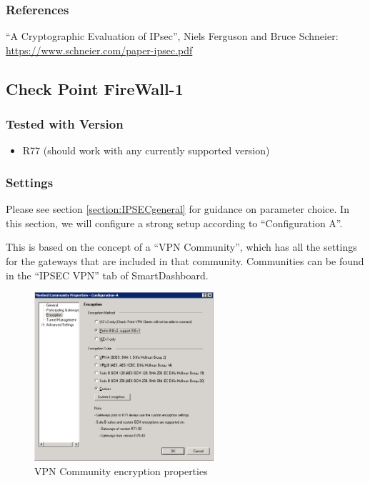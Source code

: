 \subsubsection{References}


``A Cryptographic Evaluation of IPsec'', Niels Ferguson and Bruce
  Schneier: \url{https://www.schneier.com/paper-ipsec.pdf}


\subsection{Check Point FireWall-1}


\subsubsection{Tested with Version}
\begin{itemize}
  \item R77 (should work with any currently supported version)
\end{itemize}


\subsubsection{Settings}
Please see section \ref{section:IPSECgeneral} for guidance on
parameter choice. In this section, we will configure a strong setup
according to ``Configuration A''.

This is based on the concept of a ``VPN Community'', which has all the
settings for the gateways that are included in that community.
Communities can be found in the ``IPSEC VPN'' tab of SmartDashboard.

\begin{figure}[p]
  \centering
  \includegraphics[width=0.592\textwidth]{img/checkpoint_1.png}
  \caption{VPN Community encryption properties}
  \label{fig:checkpoint_1}
\end{figure}

